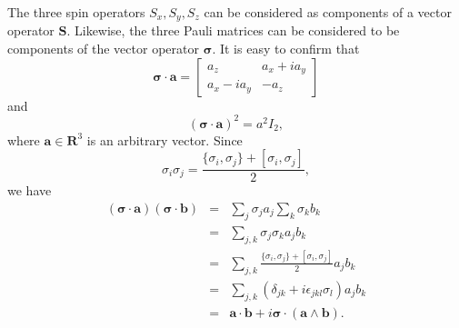 \documentclass{article}
\numberwithin{equation}{section}
\let\vec\bm
\theoremstyle{plain}
\numberwithin{thm}{section}
\theoremstyle{plain}
\numberwithin{prop}{section}
\theoremstyle{definition}
\numberwithin{defn}{section}
\theoremstyle{remark}
\begin{document}
The three spin operators $S_x, S_y, S_z$ can be considered as components of
a vector operator $\vec{S}$. Likewise, the three Pauli matrices can be 
considered to be components of the vector operator $\vec{\sigma}$. It is
easy to confirm that
\begin{equation}\label{s5e13}
\vec{\sigma}\cdot\vec{a} = \begin{bmatrix}a_z & a_x + ia_y \\ a_x -ia_y & -a_z
\end{bmatrix}
\end{equation}
and
\begin{equation}\label{s5e14}
(\vec{\sigma}\cdot\vec{a})^2 = a^2 I_2,
\end{equation}
where $\vec{a} \in \mathbf{R}^3$ is an arbitrary vector. Since
\begin{equation}\label{s5e15}
\sigma_i\sigma_j = \frac{\{\sigma_i, \sigma_j\} + [\sigma_i, \sigma_j]}{2},
\end{equation}
we have
\begin{eqnarray}
(\vec{\sigma}\cdot\vec{a})(\vec{\sigma}\cdot\vec{b}) &=&
\sum_j \sigma_j a_j \sum_k \sigma_k b_k \nonumber \\
 &=& \sum_{j,k} \sigma_j\sigma_k a_j b_k \nonumber \\
 &=& \sum_{j,k}\frac{\{\sigma_i, \sigma_j\} + [\sigma_i, \sigma_j]}{2}a_jb_k
\nonumber \\
 &=& \sum_{j,k}(\delta_{jk} + i\epsilon_{jkl}\sigma_l)a_jb_k \nonumber \\
 &=& \vec{a}\cdot\vec{b} + i\vec{\sigma}\cdot(\vec{a} \wedge \vec{b}) 
\label{s5e16}.
\end{eqnarray}
\end{document}
